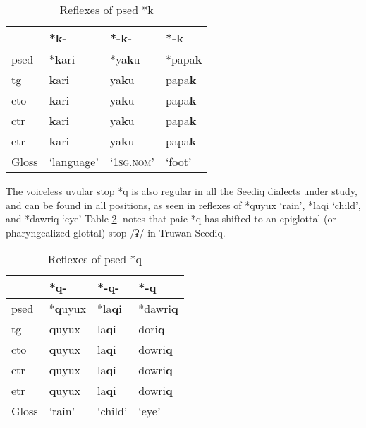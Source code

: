 \begin{table}[!htbp]
\centering
\caption{Reflexes of \acl{psed} *k}
\label{tab:psed_k}
\begin{tabular}{llll}
\hline
           & *k-        & *-k-               & *-k           \\ \hline
\acs{psed} & *\textbf{k}ari      & *ya\textbf{k}u              & *papa\textbf{k}        \\ \hdashline
\acs{tg}   & \textbf{k}ari       & ya\textbf{k}u               & papa\textbf{k}         \\
\acs{cto}  & \textbf{k}ari       & ya\textbf{k}u               & papa\textbf{k}         \\
\acs{ctr}  & \textbf{k}ari       & ya\textbf{k}u               & papa\textbf{k}         \\
\acs{etr}  & \textbf{k}ari       & ya\textbf{k}u               & papa\textbf{k}         \\ \hline
Gloss      & `language' & `\textsc{1sg.nom}' & `foot' \\ \hline
\end{tabular}
\end{table}

The voiceless uvular stop *q is also regular in all the Seediq dialects under study, and can be found in all positions, as seen in reflexes of *quyux `rain', *laqi `child', and *dawriq `eye' Table \ref{tab:psed_q}. \textcite{li1981paic} notes that \acl{paic} *q has shifted to an epiglottal (or pharyngealized glottal) stop /ʡ/ in Truwan Seediq. 

\begin{table}[!htbp]
\centering
\caption{Reflexes of \acl{psed} *q}
\label{tab:psed_q}
\begin{tabular}{llll}
\hline
           & *q-    & *-q-    & *-q     \\ \hline
\acs{psed} & *\textbf{q}uyux & *la\textbf{q}i   & *dawri\textbf{q}  \\ \hdashline
\acs{tg}   & \textbf{q}uyux  & la\textbf{q}i    & dori\textbf{q}   \\
\acs{cto}  & \textbf{q}uyux  & la\textbf{q}i    & dowri\textbf{q}   \\
\acs{ctr}  & \textbf{q}uyux  & la\textbf{q}i    & dowri\textbf{q}   \\
\acs{etr}  & \textbf{q}uyux  & la\textbf{q}i    & dowri\textbf{q}   \\ \hline
Gloss      & `rain' & `child' & `eye' \\ \hline
\end{tabular}
\end{table}

